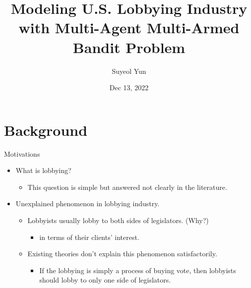 \documentclass{beamer}
\begin{document}
	\title[]{Modeling U.S. Lobbying Industry with Multi-Agent Multi-Armed Bandit Problem}
	\author[Suyeol Yun]{Suyeol Yun}
	\date{Dec 13, 2022}
	\frame{\titlepage}
	\section{Background}

	\begin{frame}{Motivations}
		\fontsize{13pt}{12pt}
		\begin{itemize}
			\item What is lobbying?
			\begin{itemize}
				\item This question is simple but answered not clearly in the literature.
			\end{itemize}
		\end{itemize}
		\begin{itemize}
			\item Unexplained phenomenon in lobbying industry. 
			\begin{itemize}
				\item Lobbyists usually lobby to both sides of legislators. (Why?)
				\begin{itemize}
					\item in terms of their clients' interest.
				\end{itemize}
				\item Existing theories don't explain this phenomenon satisfactorily.
				\begin{itemize}
					\item If the lobbying is simply a process of buying vote, 
					then lobbyists should lobby to only one side of legislators.
				\end{itemize}
				\end{itemize}
		\end{itemize}
	\end{frame}
\end{document}
